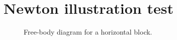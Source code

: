 \documentclass[11pt]{article}
\begin{document}
\section*{Newton illustration test}
\begin{figure}[H]
\centering

\caption{Free-body diagram for a horizontal block.}
\end{figure}
\end{document}

